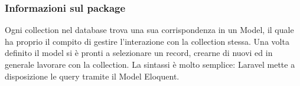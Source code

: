 \subsubsection*{Informazioni sul package}
Ogni collection nel database trova una sua corrispondenza in un Model, il quale ha proprio il compito di gestire l'interazione con la collection stessa. Una volta definito il model si è pronti a selezionare un record, crearne di nuovi ed in generale lavorare con la collection. La sintassi è molto semplice: Laravel mette a disposizione le query tramite il Model Eloquent.
